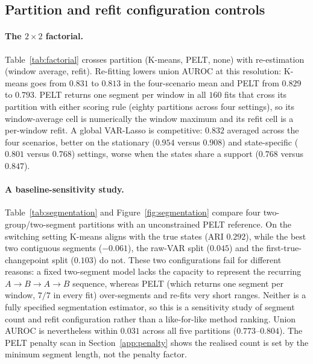 \documentclass[11pt]{article}
\begin{document}
\subsection{Partition and refit configuration controls}
\label{sec:baselines}

\paragraph{The $2\times2$ factorial.}
Table~\ref{tab:factorial} crosses partition (K-means, PELT, none) with
re-estimation (window average, refit). Re-fitting lowers union AUROC at this
resolution: K-means goes from $0.831$ to $0.813$ in the four-scenario mean and PELT from $0.829$ to
$0.793$. PELT returns one segment per window in all $160$ fits that cross its
partition with either scoring rule (eighty partitions across four settings), so
its window-average cell is numerically the window maximum and its refit cell is
a per-window refit. A global VAR-Lasso is competitive: $0.832$ averaged across the four scenarios, better on
the stationary ($0.954$ versus $0.908$) and state-specific ($0.801$ versus
$0.768$) settings, worse when the states share a support ($0.768$ versus
$0.847$).

\begin{table}[!htbp]
\centering
\caption{$2\times2$ factorial over partition and re-estimation, union AUROC
(twenty seeds per setting). ``None'' is a global VAR-Lasso with no partition.}
\label{tab:factorial}
\resizebox{\linewidth}{!}{}
\end{table}

\paragraph{A baseline-sensitivity study.}
Table~\ref{tab:segmentation} and Figure~\ref{fig:segmentation} compare four
two-group/two-segment partitions with an unconstrained PELT reference.
On the switching setting K-means aligns with the true states
(ARI $0.292$), while the best two contiguous segments ($-0.061$), the raw-VAR
split ($0.045$) and the first-true-changepoint split ($0.103$) do not. These
two configurations fail for different reasons: a fixed two-segment model lacks
the capacity to represent the recurring $A\to B\to A\to B$ sequence, whereas
PELT (which returns one segment per window, $7/7$ in every fit) over-segments
and re-fits very short ranges. Neither is a fully specified segmentation
estimator, so this is a sensitivity study of segment count and refit
configuration rather than a like-for-like method ranking. Union AUROC is
nevertheless within $0.031$ across all five partitions ($0.773$--$0.804$). The
PELT penalty scan in Section~\ref{app:penalty} shows the realised count is set
by the minimum segment length, not the penalty factor.
\end{document}
